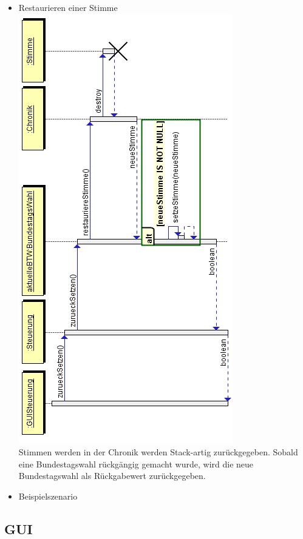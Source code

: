 \documentclass[12pt,a4paper,titlepage]{article}
\begin{document}
\begin{itemize}
	\item Restaurieren einer Stimme \\
		\includegraphics[scale=0.7]{Sequenzdiagramme/Chronik_Sequenzdiagramm-restaurieren.png}
		\\
		Stimmen werden in der Chronik werden Stack-artig zurückgegeben. Sobald eine Bundestagswahl rückgängig gemacht wurde, wird die neue Bundestagswahl als Rückgabewert zurückgegeben.
	\item Beispielszenario	
\end{itemize}

\newpage
\subsection{GUI}
\end{document}
